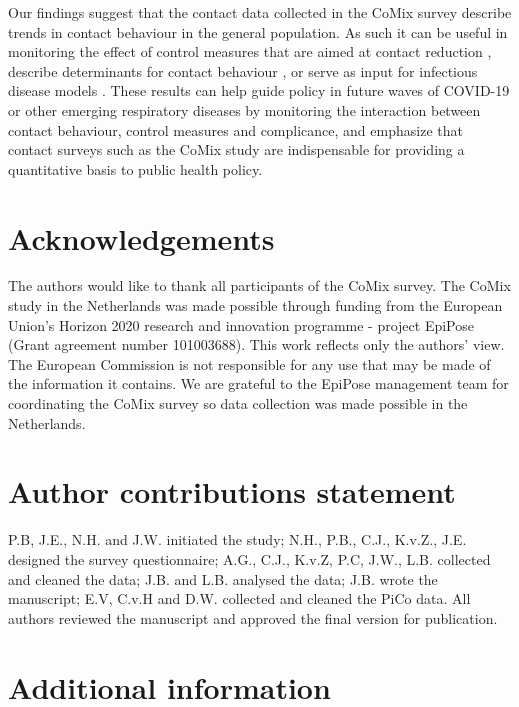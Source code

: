 \documentclass[fleqn,10pt]{wlscirep}
\begin{document}
Our findings suggest that the contact data collected in the CoMix survey describe trends in contact behaviour in the general population. As such it can be useful in monitoring the effect of control measures that are aimed at contact reduction \cite{Coletti_2020, Jarvis_2021, Gimma_2022}, describe determinants for contact behaviour \cite{Wambua_2022, Wong_2022a}, or serve as input for infectious disease models \cite{Coletti_2021, Munday_2021, Franco_2022}. These results can help guide policy in future waves of COVID-19 or other emerging respiratory diseases by monitoring the interaction between contact behaviour, control measures and complicance, and emphasize that contact surveys such as the CoMix study are indispensable for providing a quantitative basis to public health policy.




\section*{Acknowledgements}

The authors would like to thank all participants of the CoMix survey. The CoMix study in the Netherlands was made possible through funding from the European Union's Horizon 2020 research and innovation programme - project EpiPose (Grant agreement number 101003688). This work reflects only the authors’ view. The European Commission is not responsible for any use that may be made of the information it contains. We are grateful to the EpiPose management team for coordinating the CoMix survey so data collection was made possible in the Netherlands. 


\section*{Author contributions statement}

P.B, J.E., N.H. and J.W. initiated the study; N.H., P.B., C.J., K.v.Z., J.E. designed the survey questionnaire; A.G., C.J., K.v.Z, P.C, J.W., L.B. collected and cleaned the data; J.B. and L.B. analysed the data; J.B. wrote the manuscript; E.V, C.v.H and D.W. collected and cleaned the PiCo data. All authors reviewed the manuscript and approved the final version for publication. 

\section*{Additional information}
\end{document}

